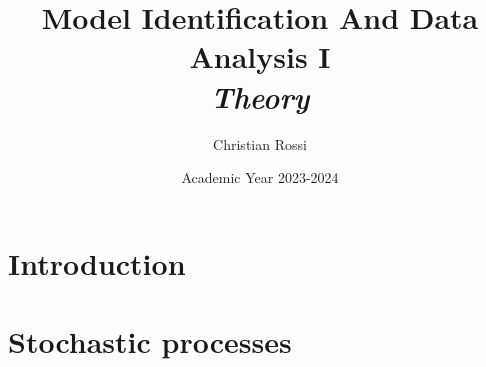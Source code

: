 \documentclass[12pt, a4paper]{report}
\title{Model Identification And Data Analysis I \\ \textit{Theory}}
\author{Christian Rossi}
\date{Academic Year 2023-2024}
\begin{document}
    \maketitle

    

    \cleardoublepage

    \tableofcontents

    \cleardoublepage

    \chapter{Introduction}
    
    

    \chapter{Stochastic processes}
    
\end{document}
